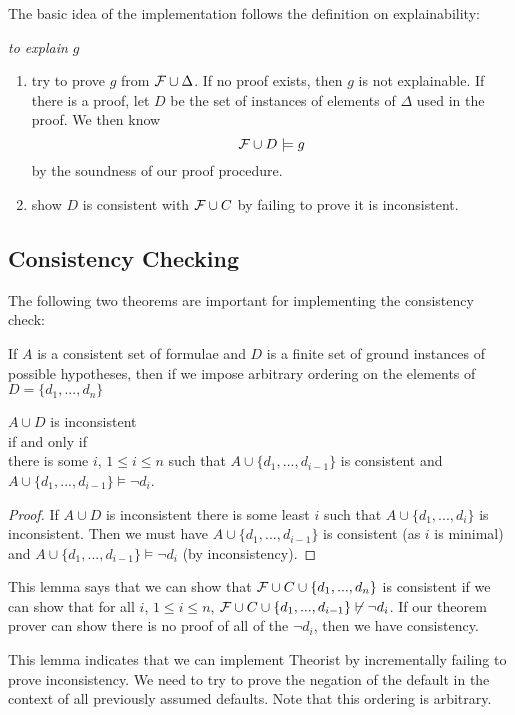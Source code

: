 The basic idea of the implementation follows the definition on explainability:
\begin{algorithm}\em \label{basic-alg}
to explain $g$
\begin{enumerate}
\item try to prove $g$ from ${\cal F}\cup \Delta$. If no proof exists, then
$g$ is not explainable. If there is a proof, let $D$ be the set of instances of
elements of $\Delta$ used in the proof. We then know
\[{\cal F}\cup D \models g\]
by the soundness of our proof procedure.
\item show $D$ is consistent with ${\cal F}\cup C$
by failing to prove it is inconsistent.
\end{enumerate}
\end{algorithm}

\subsection{Consistency Checking}
The following two theorems are important for implementing the consistency
check:
\begin{lemma} \label{incremantal}
If $A$ is a consistent set of formulae and
$D$ is a finite set of ground instances of possible hypotheses, then
if we impose arbitrary ordering on the elements of $D=\{d_1,...,d_n\}$
\begin{center}
$A\cup D$ is inconsistent\\if and only if\\
there is some $i$, $1\leq i \leq n$ such that
$A\cup \{d_1,...,d_{i-1}\}$ is consistent and\\
$A\cup \{d_1,...,d_{i-1}\}\models \neg d_i$.
\end{center}
\end{lemma}
\begin{proof}
If $A \cup D $ is inconsistent there is some least $i$ such
that $A\cup \{d_1,...,d_i\}$ is inconsistent. Then we must have
$A\cup \{d_1,...,d_{i-1}\}$ is consistent (as $i$ is minimal) and
$A\cup \{d_1,...,d_{i-1}\}\models \neg d_i$ (by inconsistency).
\end{proof}

This lemma says that we can show that ${\cal F}\cup C \cup \{d_1,...,d_n\}$ is 
consistent if we can show that for all $i$, $1\leq i \leq n$,
${\cal F}\cup C\cup \{d_1,...,d_{i-1}\}\not\vdash \neg d_i$.
If our theorem prover can show there is no proof of all of
the $\neg d_i$, then we have consistency.

This lemma indicates that we can implement Theorist by incrementally failing to
prove inconsistency. We need to try to prove the negation of the
default in the context of all previously assumed defaults.
Note that this ordering is arbitrary.

